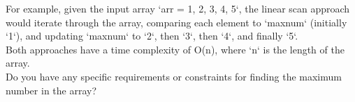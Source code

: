 \documentclass[preview]{standalone}
\begin{document}
For example, given the input array `arr = 1, 2, 3, 4, 5`, the linear scan approach would iterate through the array, comparing each element to `maxnum` (initially `1`), and updating `maxnum` to `2`, then `3`, then `4`, and finally `5`.\\Both approaches have a time complexity of O(n), where `n` is the length of the array.\\Do you have any specific requirements or constraints for finding the maximum number in the array?\\
\end{document}

